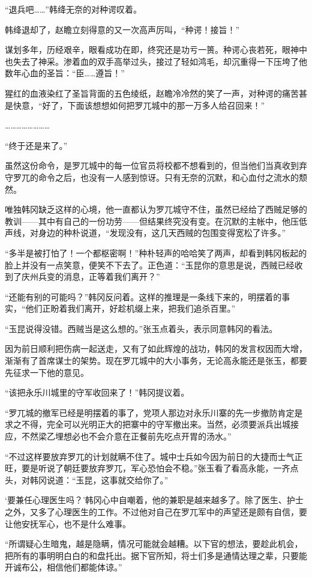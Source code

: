 “退兵吧……”韩绛无奈的对种谔叹着。

韩绛退却了，赵瞻立刻得意的又一次高声厉叫，“种谔！接旨！”

谋划多年，历经艰辛，眼看成功在即，终究还是功亏一篑。种谔心丧若死，眼神中也失去了神采。渗着血的双手高举过头，接过了轻如鸿毛，却沉重得一下压垮了他数年心血的圣旨：“臣……遵旨！”

猩红的血液染红了圣旨背面的五色绫纸，赵瞻冷冷然的笑了一声，对种谔的痛苦甚是快意，“好了，下面该想想如何把罗兀城中的那一万多人给召回来！”

……………………

“终于还是来了。”

虽然这份命令，是罗兀城中的每一位官员将校都不想看到的，但当他们当真收到弃守罗兀的命令之后，也没有一人感到惊讶。只有无奈的沉默，和心血付之流水的颓然。

唯独韩冈缺乏这样的心境，他一直都认为罗兀城守不住，虽然已经给了西贼足够的教训——其中有自己的一份功劳——但结果终究没有变。在沉默的主帐中，他压低声线，对身边的种朴说道，“发现没有，这几天西贼的包围变得宽松了许多。”

“多半是被打怕了！一个都枢密啊！”种朴轻声的哈哈笑了两声，却看到韩冈板起的脸上并没有一点笑意，便笑不下去了。正色道：“玉昆你的意思是说，西贼已经收到了庆州兵变的消息，正等着我们离开？”

“还能有别的可能吗？”韩冈反问着。这样的推理是一条线下来的，明摆着的事实，“他们正盼着我们离开，好趁机缀上来，把我们追杀百里。”

“玉昆说得没错。西贼当是这么想的。”张玉点着头，表示同意韩冈的看法。

因为前日顺利把伤病一起送走，又有了如此辉煌的战功，韩冈的发言权因而大增，渐渐有了首席谋士的架势。现在罗兀城中的大小事务，无论高永能还是张玉，都要先征求一下他的意见。

“该把永乐川城里的守军收回来了！”韩冈提议着。

“罗兀城的撤军已经是明摆着的事了，党项人那边对永乐川寨的先一步撤防肯定是求之不得，完全可以光明正大的把寨中的守军撤出来。当然，必须要派兵出城接应，不然梁乙埋想必也不会介意在正餐前先吃点开胃的汤水。”

“不过这样要放弃罗兀的计划就瞒不住了。城中士兵如今因为前日的大捷而士气正旺，要是听说了朝廷要放弃罗兀，军心恐怕会不稳。”张玉看了看高永能，一齐点头，对韩冈说道：“玉昆，这事就交给你了。”

‘要兼任心理医生吗？’韩冈心中自嘲着，他的兼职是越来越多了。除了医生、护士之外，又多了心理医生的工作。不过他对自己在罗兀军中的声望还是颇有自信，要让他安抚军心，也不是什么难事。

“所谓疑心生暗鬼，越是隐瞒，情况可能就会越糟。以下官的想法，要趁此机会，把所有的事明明白白的和盘托出。据下官所知，将士们多是通情达理之辈，只要能开诚布公，相信他们都能体谅。”

